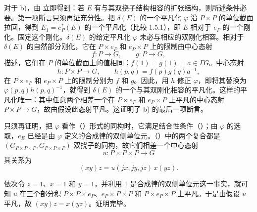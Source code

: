 对于 b)，由  立即得到：若 $E$ 有与其双挠子结构相容的扩张结构，则所述条件必要。第一项断言只须再证充分性。把 $\delta(E)$ 的一个平凡化 $\varphi$ 沿 $P\times P$ 的单位截面拉回，得到 $E_1=e_P^*(E)$ 的一个平凡化（比较 1.5.1），即 $E$ 相对于 $e_P$ 的一个刚化。固定这个刚化。$\delta(E)$ 的给定平凡化 $\varphi$ 未必与相应的双刚化相容。相对于 $\delta(E)$ 的自然部分刚化，它在 $P\times e_P$ 和 $e_P\times P$ 上的限制由中心态射
\begin{equation*}
 f:P\longrightarrow G,\qquad g:P\longrightarrow G,
\end{equation*}
描述，它们在 $P$ 的单位截面上的值相同：$f(1)=g(1)=a\in\Gamma G$。中心态射
\begin{equation*}
 h:P\times P\longrightarrow G,\qquad h(p,q)=f(p)g(q)a^{-1},
\end{equation*}
在 $P\times e_P$ 和 $e_P\times P$ 上的限制分别为 $f$ 和 $g$。因此，用 $h$ 修正 $\varphi$，即将其替换为 $\varphi(p,q)h(p,q)^{-1}$，就得到 $\delta(E)$ 的一个与其双刚化相容的平凡化。这样的平凡化唯一：其中任意两个相差一个在 $P\times e_P$ 和 $e_P\times P$ 上平凡的中心态射 $P\times P\longrightarrow G$，故由假设此态射平凡。这证明了  b) 的最后一项断言。

只须再证明，把 $\varphi$ 看作（）形式的同构时，它满足结合性条件（）；由 $\varphi$ 的选取，$e_E$ 已经是由 $\varphi$ 定义的合成律的双侧单位元。（）中的两个复合都是 $(G_{P\times P\times P},G_{P\times P\times P})$-双挠子的同构，故它们相差一个中心态射
\begin{equation*}
 u:P\times P\times P\longrightarrow G
\end{equation*}
其关系为
\begin{equation*}
 (xy)z=u(jx,jy,jz)\,x(yz).
\end{equation*}



依次令 $z=1$、$x=1$ 和 $y=1$，并利用 $1$ 是合成律的双侧单位元这一事实，就可知 $u$ 在三个部分积 $P\times P\times e_P$、$e_P\times P\times P$ 和 $P\times e_P\times P$ 上平凡。于是由假设 $u$ 平凡，故 $(xy)z=x(yz)$。证明完毕。




